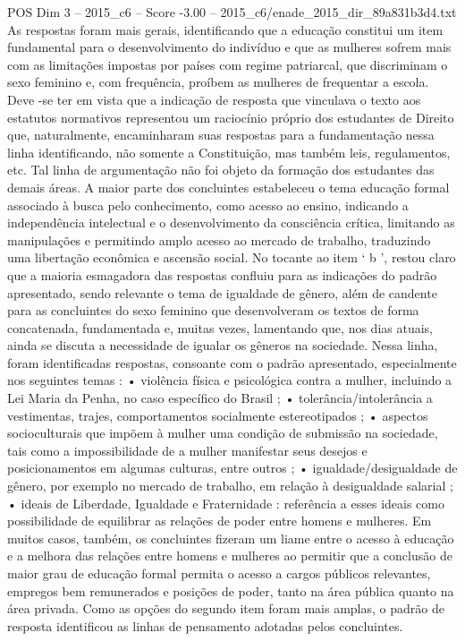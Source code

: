 \begin{textsample}{POS Dim 3 – 2015\_c6 – Score -3.00 – 2015\_c6/enade\_2015\_dir\_89a831b3d4.txt}
As respostas foram mais gerais, identificando que a educação constitui um item fundamental para o desenvolvimento do indivíduo e que as mulheres sofrem mais com as limitações impostas por países com regime patriarcal, que discriminam o sexo feminino e, com frequência, proíbem as mulheres de frequentar a escola.
Deve -se ter em vista que a indicação de resposta que vinculava o texto aos estatutos normativos representou um raciocínio próprio dos estudantes de Direito que, naturalmente, encaminharam suas respostas para a fundamentação nessa linha identificando, não somente a Constituição, mas também leis, regulamentos, etc.
Tal linha de argumentação não foi objeto da formação dos estudantes das demais áreas.
A maior parte dos concluintes estabeleceu o tema educação formal associado à busca pelo conhecimento, como acesso ao ensino, indicando a independência intelectual e o desenvolvimento da consciência crítica, limitando as manipulações e permitindo amplo acesso ao mercado de trabalho, traduzindo uma libertação econômica e ascensão social.
No tocante ao item ‘ b ’, restou claro que a maioria esmagadora das respostas confluiu para as indicações do padrão apresentado, sendo relevante o tema de igualdade de gênero, além de candente para as concluintes do sexo feminino que desenvolveram os textos de forma concatenada, fundamentada e, muitas vezes, lamentando que, nos dias atuais, ainda se discuta a necessidade de igualar os gêneros na sociedade.
Nessa linha, foram identificadas respostas, consoante com o padrão apresentado, especialmente nos seguintes temas : • violência física e psicológica contra a mulher, incluindo a Lei Maria da Penha, no caso específico do Brasil ; • tolerância/intolerância a vestimentas, trajes, comportamentos socialmente estereotipados ; • aspectos socioculturais que impõem à mulher uma condição de submissão na sociedade, tais como a impossibilidade de a mulher manifestar seus desejos e posicionamentos em algumas culturas, entre outros ; • igualdade/desigualdade de gênero, por exemplo no mercado de trabalho, em relação à desigualdade salarial ; • ideais de Liberdade, Igualdade e Fraternidade : referência a esses ideais como possibilidade de equilibrar as relações de poder entre homens e mulheres.
Em muitos casos, também, os concluintes fizeram um liame entre o acesso à educação e a melhora das relações entre homens e mulheres ao permitir que a conclusão de maior grau de educação formal permita o acesso a cargos públicos relevantes, empregos bem remunerados e posições de poder, tanto na área pública quanto na área privada.
Como as opções do segundo item foram mais amplas, o padrão de resposta identificou as linhas de pensamento adotadas pelos concluintes.

\end{textsample}
